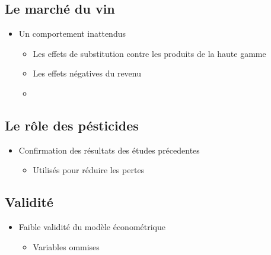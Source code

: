 \documentclass[11pt,]{article}
\providecommand{\tightlist}{%
  \setlength{\itemsep}{0pt}\setlength{\parskip}{0pt}}
\begin{document}
\FloatBarrier

\hypertarget{le-marche-du-vin}{%
\subsection{Le marché du vin}\label{le-marche-du-vin}}

\begin{itemize}
\tightlist
\item
  Un comportement inattendus

  \begin{itemize}
  \item
    Les effets de substitution contre les produits de la haute gamme
  \item
    Les effets négatives du revenu
  \item
  \end{itemize}
\end{itemize}

\FloatBarrier

\hypertarget{le-role-des-pesticides}{%
\subsection{Le rôle des pésticides}\label{le-role-des-pesticides}}

\begin{itemize}
\tightlist
\item
  Confirmation des résultats des études précedentes

  \begin{itemize}
  \tightlist
  \item
    Utilisés pour réduire les pertes
  \end{itemize}
\end{itemize}

\FloatBarrier

\hypertarget{validite}{%
\subsection{Validité}\label{validite}}

\begin{itemize}
\tightlist
\item
  Faible validité du modèle économétrique

  \begin{itemize}
  \tightlist
  \item
    Variables ommises
  \end{itemize}
\end{itemize}
\end{document}
